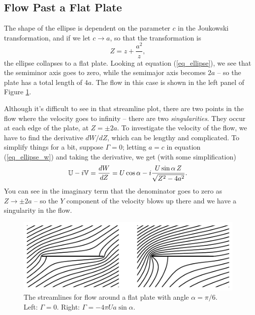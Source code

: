 
\subsection{Flow Past a Flat Plate}

The shape of the ellipse is dependent on the parameter $c$ in the Joukowski transformation, and if we let $c \to a$, so that the transformation is
\begin{equation}
Z = z + \frac{a^2}{z},
\end{equation}
the ellipse collapses to a flat plate.  Looking at equation (\ref{eq_ellipse}), we see that the semiminor axis goes to zero, while the semimajor axis becomes $2a$ -- so the plate has a total length of $4a$.  The flow in this case is shown in the left panel of Figure \ref{fig_flat_plate}.

Although it's difficult to see in that streamline plot, there are two points in the flow where the velocity goes to infinity -- there are two \emph{singularities}.  They occur at each edge of the plate, at $Z = \pm 2a$.  To investigate the velocity of the flow, we have to find the derivative $dW/dZ$, which can be lengthy and complicated.  To simplify things for a bit, suppose $\Gamma = 0$; letting $a=c$ in equation (\ref{eq_ellipse_w}) and taking the derivative, we get (with some simplification)
\[
\mathbb{U} - i\mathbb{V} = \frac{dW}{dZ} = U\cos \alpha - i \frac{U \sin \alpha \, Z}{\sqrt{Z^2 - 4a^2}}.
\]
You can see in the imaginary term that the denominator goes to zero as $Z \to \pm 2a$ -- so the $Y$ component of the velocity blows up there and we have a singularity in the flow.

\begin{figure}
\centering\includegraphics[width=\linewidth]{Figures/Chapter4/fig_flat_plate}
\caption{The streamlines for flow around a flat plate with angle $\alpha = \pi/6$.  Left: $\Gamma = 0$.  Right: $\Gamma= -4\pi Ua \sin\alpha$.}
\label{fig_flat_plate}
\end{figure}

